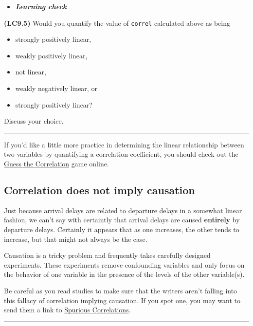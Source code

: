 \documentclass[]{tufte-book}
\let\oldrule=\rule
\renewcommand{\rule}[1]{\oldrule{\linewidth}}
\providecommand{\tightlist}{%
  \setlength{\itemsep}{0pt}\setlength{\parskip}{0pt}}
\newenvironment{rmdblock}[1]
  {\begin{shaded*}
  \begin{itemize}
  \renewcommand{\labelitemi}{
    \raisebox{-.7\height}[0pt][0pt]{
    }
  }
  \item
  }
  {
  \end{itemize}
  \end{shaded*}
  }
\newenvironment{learncheck}
  {\begin{rmdblock}{warning}}
  {\end{rmdblock}}
\begin{document}
\begin{learncheck}
\textbf{\emph{Learning check}}
\end{learncheck}

\textbf{(LC9.5)} Would you quantify the value of \texttt{correl}
calculated above as being

\begin{itemize}
\tightlist
\item
  strongly positively linear,
\item
  weakly positively linear,
\item
  not linear,
\item
  weakly negatively linear, or
\item
  strongly positively linear?
\end{itemize}

Discuss your choice.

\begin{center}\rule{0.5\linewidth}{\linethickness}\end{center}

If you'd like a little more practice in determining the linear
relationship between two variables by quantifying a correlation
coefficient, you should check out the
\href{http://guessthecorrelation.com/}{Guess the Correlation} game
online.

\subsection{Correlation does not imply
causation}\label{correlation-does-not-imply-causation}

Just because arrival delays are related to departure delays in a
somewhat linear fashion, we can't say with certaintly that arrival
delays are caused \textbf{entirely} by departure delays. Certainly it
appears that as one increases, the other tends to increase, but that
might not always be the case.

Causation is a tricky problem and frequently takes carefully designed
experiments. These experiments remove confounding variables and only
focus on the behavior of one variable in the presence of the levels of
the other variable(s).

Be careful as you read studies to make sure that the writers aren't
falling into this fallacy of correlation implying causation. If you spot
one, you may want to send them a link to
\href{http://www.tylervigen.com/spurious-correlations}{Spurious
Correlations}.

\begin{center}\rule{0.5\linewidth}{\linethickness}\end{center}
\end{document}
